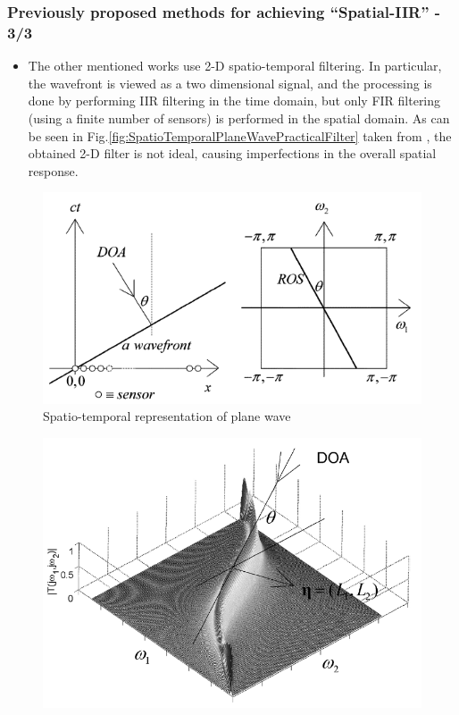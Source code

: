 \documentclass[10pt,pdflatex,headrule,landscape]{beamer}
\begin{document}
\begin{frame}
\frametitle{Previously proposed methods for achieving ``Spatial-IIR'' - 3/3}
\begin{minipage}{0.75\textwidth}
\begin{itemize}
\item
{
The other mentioned works use 2-D spatio-temporal filtering. In particular, the wavefront is viewed as a two dimensional signal, and the processing is done by performing IIR filtering in the time domain, but only FIR filtering (using a finite number of sensors) is performed in the spatial domain.
As can be seen in Fig.\ref{fig:SpatioTemporalPlaneWavePracticalFilter} taken from \cite{Bruton2003Three-dimensionalBanks}, the obtained 2-D filter is not ideal, causing imperfections in the overall spatial response.
}
\end{itemize}
\end{minipage}
\begin{minipage}{0.18\textwidth}
\begin{figure}
\includegraphics[width=\textwidth]{Media/SpatioTemporalPlaneWave.PNG}
\caption{Spatio-temporal representation of plane wave}
\label{fig:SpatioTemporalPlaneWave}
\end{figure}
\begin{figure}
\includegraphics[width=\textwidth]{Media/SpatioTemporalPlaneWavePracticalFilter.PNG}

\end{figure}
\end{minipage}
\end{frame}
\end{document}
